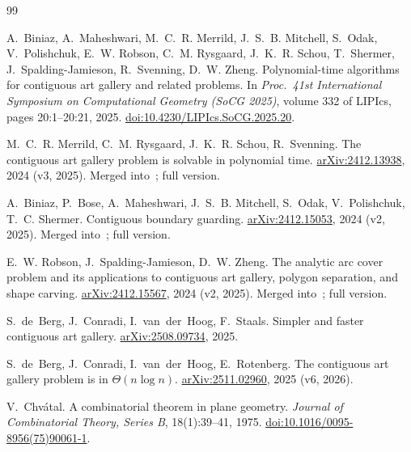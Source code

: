 \documentclass[11pt,a4paper]{article}
\theoremstyle{definition}
\theoremstyle{remark}
\begin{document}
\begin{thebibliography}{99}

A.~Biniaz, A.~Maheshwari, M.~C.~R. Merrild, J.~S.~B. Mitchell, S.~Odak, V.~Polishchuk, E.~W. Robson, C.~M. Rysgaard, J.~K.~R. Schou, T.~Shermer,
J.~Spalding-Jamieson, R.~Svenning, D.~W. Zheng.
\newblock Polynomial-time algorithms for contiguous art gallery and related problems.
\newblock In \emph{Proc.\ 41st International Symposium on Computational Geometry (SoCG 2025)}, volume 332 of LIPIcs, pages 20:1--20:21, 2025.
\newblock \href{https://doi.org/10.4230/LIPIcs.SoCG.2025.20}{doi:10.4230/LIPIcs.SoCG.2025.20}.

M.~C.~R. Merrild, C.~M. Rysgaard, J.~K.~R. Schou, R.~Svenning.
\newblock The contiguous art gallery problem is solvable in polynomial time.
\newblock \href{https://arxiv.org/abs/2412.13938}{arXiv:2412.13938}, 2024 (v3, 2025). Merged into~\cite{Biniaz2025}; full version.

A.~Biniaz, P.~Bose, A.~Maheshwari, J.~S.~B. Mitchell, S.~Odak, V.~Polishchuk, T.~C. Shermer.
\newblock Contiguous boundary guarding.
\newblock \href{https://arxiv.org/abs/2412.15053}{arXiv:2412.15053}, 2024 (v2, 2025). Merged into~\cite{Biniaz2025}; full version.

E.~W. Robson, J.~Spalding-Jamieson, D.~W. Zheng.
\newblock The analytic arc cover problem and its applications to contiguous art gallery, polygon separation, and shape carving.
\newblock \href{https://arxiv.org/abs/2412.15567}{arXiv:2412.15567}, 2024 (v2, 2025). Merged into~\cite{Biniaz2025}; full version.

S.~de~Berg, J.~Conradi, I.~van~der~Hoog, F.~Staals.
\newblock Simpler and faster contiguous art gallery.
\newblock \href{https://arxiv.org/abs/2508.09734}{arXiv:2508.09734}, 2025.

S.~de~Berg, J.~Conradi, I.~van~der~Hoog, E.~Rotenberg.
\newblock The contiguous art gallery problem is in $\Theta(n\log n)$.
\newblock \href{https://arxiv.org/abs/2511.02960}{arXiv:2511.02960}, 2025 (v6, 2026).

V.~Chv\'atal.
\newblock A combinatorial theorem in plane geometry.
\newblock \emph{Journal of Combinatorial Theory, Series B}, 18(1):39--41, 1975.
\newblock \href{https://doi.org/10.1016/0095-8956(75)90061-1}{doi:10.1016/0095-8956(75)90061-1}.


\end{thebibliography}
\end{document}
